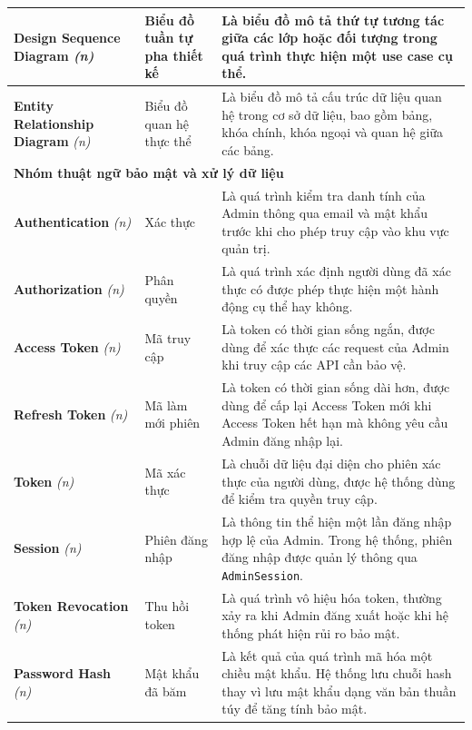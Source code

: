 \documentclass[a4paper,12pt]{article}
\begin{document}
\begin{longtable}{|p{3.5cm}|p{3.5cm}|p{8cm}|}
\textbf{Design Sequence Diagram} \textit{(n)} & Biểu đồ tuần tự pha thiết kế & Là biểu đồ mô tả thứ tự tương tác giữa các lớp hoặc đối tượng trong quá trình thực hiện một use case cụ thể. \\
\hline

\textbf{Entity Relationship Diagram} \textit{(n)} & Biểu đồ quan hệ thực thể & Là biểu đồ mô tả cấu trúc dữ liệu quan hệ trong cơ sở dữ liệu, bao gồm bảng, khóa chính, khóa ngoại và quan hệ giữa các bảng. \\
\hline

\multicolumn{3}{|l|}{\textbf{Nhóm thuật ngữ bảo mật và xử lý dữ liệu}} \\
\hline

\textbf{Authentication} \textit{(n)} & Xác thực & Là quá trình kiểm tra danh tính của Admin thông qua email và mật khẩu trước khi cho phép truy cập vào khu vực quản trị. \\
\hline

\textbf{Authorization} \textit{(n)} & Phân quyền & Là quá trình xác định người dùng đã xác thực có được phép thực hiện một hành động cụ thể hay không. \\
\hline

\textbf{Access Token} \textit{(n)} & Mã truy cập & Là token có thời gian sống ngắn, được dùng để xác thực các request của Admin khi truy cập các API cần bảo vệ. \\
\hline

\textbf{Refresh Token} \textit{(n)} & Mã làm mới phiên & Là token có thời gian sống dài hơn, được dùng để cấp lại Access Token mới khi Access Token hết hạn mà không yêu cầu Admin đăng nhập lại. \\
\hline

\textbf{Token} \textit{(n)} & Mã xác thực & Là chuỗi dữ liệu đại diện cho phiên xác thực của người dùng, được hệ thống dùng để kiểm tra quyền truy cập. \\
\hline

\textbf{Session} \textit{(n)} & Phiên đăng nhập & Là thông tin thể hiện một lần đăng nhập hợp lệ của Admin. Trong hệ thống, phiên đăng nhập được quản lý thông qua \texttt{AdminSession}. \\
\hline

\textbf{Token Revocation} \textit{(n)} & Thu hồi token & Là quá trình vô hiệu hóa token, thường xảy ra khi Admin đăng xuất hoặc khi hệ thống phát hiện rủi ro bảo mật. \\
\hline

\textbf{Password Hash} \textit{(n)} & Mật khẩu đã băm & Là kết quả của quá trình mã hóa một chiều mật khẩu. Hệ thống lưu chuỗi hash thay vì lưu mật khẩu dạng văn bản thuần túy để tăng tính bảo mật. \\
\hline


\end{longtable}
\end{document}

